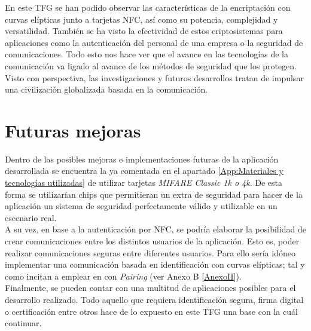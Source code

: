\documentclass[../PFC.tex]{subfiles}
\begin{document}
En este TFG se han podido observar las características de la encriptación con curvas elípticas junto a tarjetas NFC, así como su potencia, complejidad y versatilidad. También se ha visto la efectividad de estos criptosistemas para aplicaciones como la autenticación del personal de una empresa o la seguridad de comunicaciones. Todo esto nos hace ver que el avance en las tecnologías de la comunicación va ligado al avance de los métodos de seguridad que los protegen. Visto con perspectiva, las investigaciones y futuros desarrollos tratan de impulsar una civilización globalizada basada en la comunicación.

\section{Futuras mejoras}
\label{Futuras mejoras}

Dentro de las posibles mejoras e implementaciones futuras de la aplicación desarrollada se encuentra la ya comentada en el apartado \ref{App:Materiales y tecnologías utilizadas} de utilizar tarjetas \textit{MIFARE Classic 1k o 4k}. De esta forma se utilizarían chips que permitieran un extra de seguridad para hacer de la aplicación un sistema de seguridad perfectamente válido y utilizable en un escenario real.
\*
\vspace{0.5515cm}
\\
A su vez, en base a la autenticación por NFC, se podría elaborar la posibilidad de crear comunicaciones entre los distintos usuarios de la aplicación. Esto es, poder realizar comunicaciones seguras entre diferentes usuarios. Para ello sería idóneo implementar una comunicación basada en identificación con curvas elípticas; tal y como incitan a emplear en\cite{boneh2001identity} con \textit{Pairing}\cite{dupont2006provably} (ver Anexo B \ref{AnexoII}).
\*
\vspace{0.5515cm}
\\
Finalmente, se pueden contar con una multitud de aplicaciones posibles para el desarrollo realizado. Todo aquello que requiera identificación segura, firma digital o certificación entre otros hace de lo expuesto en este TFG una base con la cuál continuar.
\end{document}
